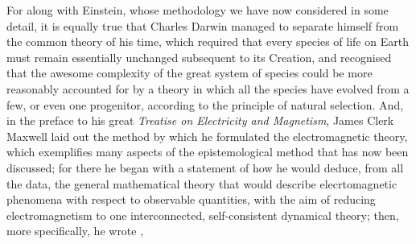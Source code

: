 For along with Einstein, whose methodology we have now considered in some detail, it is equally true that Charles Darwin managed to separate himself from the common theory of his time, which required that every species of life on Earth must remain essentially unchanged subsequent to its Creation, and recognised that the awesome complexity of the great system of species could be more reasonably accounted for by a theory in which all the species have evolved from a few, or even one progenitor, according to the principle of natural selection. And, in the preface to his great \textit{Treatise on Electricity and Magnetism}, James Clerk Maxwell laid out the method by which he formulated the electromagnetic theory, which exemplifies many aspects of the epistemological method that has now been discussed; for there he began with a statement of how he would deduce, from all the data, the general mathematical theory that would describe elecrtomagnetic phenomena with respect to observable quantities, with the aim of reducing electromagnetism to one interconnected, self-consistent dynamical theory; then, more specifically, he wrote \cite{Maxwell1892},
